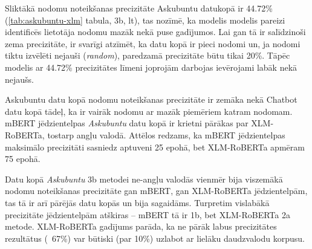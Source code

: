 Sliktākā nodomu noteikšanas precizitāte Askubuntu datukopā ir 44.72\% (\ref{tab:askubuntu-xlm} tabula, 3b, lt), tas nozīmē, ka modelis modelis pareizi identificēs lietotāja nodomu mazāk nekā puse gadījumos. Lai gan tā ir salīdzinoši zema precizitāte, ir svarīgi atzīmēt, ka datu kopā ir pieci nodomi un, ja nodomi tiktu izvēlēti nejauši (\textit{random}), paredzamā precizitāte būtu tikai 20\%. Tāpēc modelis ar 44.72\% precizitātes līmeni joprojām darbojas ievērojami labāk nekā nejaušs.

Askubuntu datu kopā nodomu noteikšanas precizitāte ir zemāka nekā Chatbot datu kopā tādeļ, ka ir vairāk nodomu ar mazāk piemēriem katram nodomam. mBERT jēdzientelpas \textit{Askubuntu} datu kopā ir krietni pārākas par XLM-RoBERTa, tostarp angļu valodā. Attēlos redzams, ka mBERT jēdzientelpas maksimālo precizitāti sasniedz aptuveni 25 epohā, bet XLM-RoBERTa apmēram 75 epohā.

Datu kopā \textit{Askubuntu} 3b metodei ne-angļu valodās vienmēr bija viszemākā nodomu noteikšanas precizitāte gan mBERT, gan XLM-RoBERTa jēdzientelpām, tas tā ir arī pārējās datu kopās un bija sagaidāms. Turpretim vislabākā precizitāte jēdzientelpām atškiras -- mBERT tā ir 1b, bet XLM-RoBERTa 2a metode. XLM-RoBERTa gadījums parāda, ka ne pārāk labus precizitātes rezultātus (~67\%) var būtiski (par 10\%) uzlabot ar lielāku daudzvalodu korpusu.



